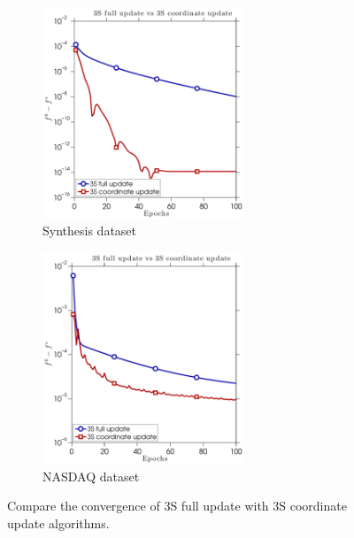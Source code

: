 \begin{figure} \centering
    \begin{subfigure}[b]{0.45\linewidth}
        \includegraphics[width=60mm]{./figs/synth_data_f_err_cropped}
        \caption{Synthesis dataset}
        \label{fig:3s_synth}
    \end{subfigure} %
    \quad
    \begin{subfigure}[b]{0.45\linewidth}
        \includegraphics[width=60mm]{./figs/real_data_f_err_cropped}
        \caption{NASDAQ dataset}
        \label{fig:3s_real}
    \end{subfigure} %
    \caption{Compare the convergence of 3S full update with 3S coordinate update algorithms.}
    \label{fig:3s_results}
\end{figure}

